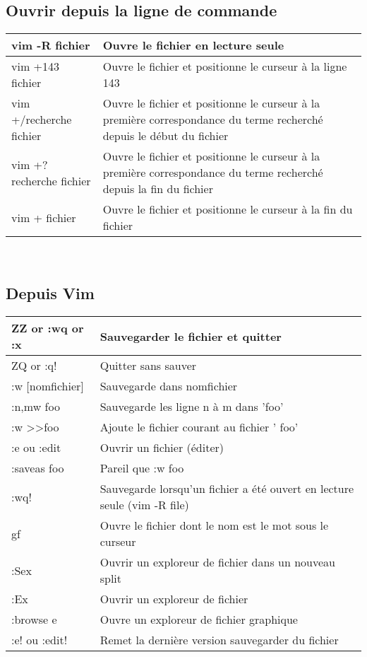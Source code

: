 \documentclass{article}
\begin{document}
\subsection{Ouvrir depuis la ligne de commande}
\begin{tabular}{|p{4cm}| l| }
\hline
vim -R  fichier & Ouvre le fichier en lecture seule \\ \hline
vim +143 fichier & Ouvre le fichier et positionne le curseur à la ligne 143 \\ \hline
vim +/recherche fichier & Ouvre le fichier et positionne le curseur à la première correspondance du terme recherché depuis le début du fichier   \\ \hline
vim +?recherche fichier & Ouvre le fichier et positionne le curseur à la première correspondance du terme recherché depuis la fin du fichier \\ \hline
vim + fichier & Ouvre le fichier et positionne le curseur à la fin du fichier  \\ \hline
\end{tabular}\\


\subsection{Depuis Vim}
\begin{tabular}{|p{3cm}| l| }
\hline
ZZ or :wq or :x & Sauvegarder le fichier et quitter\\ \hline
ZQ or :q! & Quitter sans sauver\\ \hline
:w [nomfichier]& Sauvegarde dans nomfichier \\ \hline
:n,mw foo & Sauvegarde les ligne n à m dans 'foo' \\ \hline
:w \textgreater \textgreater foo & Ajoute le fichier courant au fichier ' foo'\\ \hline
:e ou :edit & Ouvrir un fichier (éditer) \\ \hline
:saveas foo & Pareil que :w foo \\ \hline
:wq! & Sauvegarde lorsqu'un fichier a été ouvert en lecture seule (vim -R file) \\ \hline
gf & Ouvre le fichier dont le nom est le mot sous le curseur\\ \hline
:Sex & Ouvrir un exploreur de fichier dans un nouveau split\\ \hline
:Ex & Ouvrir un exploreur de fichier\\ \hline
:browse e & Ouvre un exploreur de fichier graphique \\ \hline
:e! ou :edit! & Remet la dernière version sauvegarder du fichier \\ \hline
\end{tabular}\\
\end{document}
